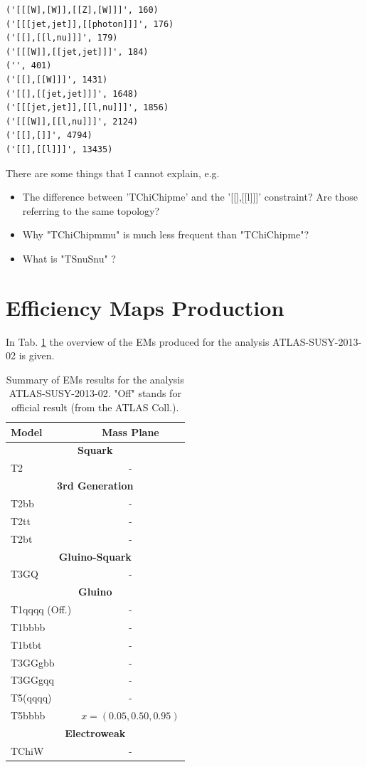 \documentclass[a4paper,11pt]{article}
\begin{document}
\begin{verbatim}
('[[[W],[W]],[[Z],[W]]]', 160)
('[[[jet,jet]],[[photon]]]', 176)
('[[],[[l,nu]]]', 179)
('[[[W]],[[jet,jet]]]', 184)
('', 401)
('[[],[[W]]]', 1431)
('[[],[[jet,jet]]]', 1648)
('[[[jet,jet]],[[l,nu]]]', 1856)
('[[[W]],[[l,nu]]]', 2124)
('[[],[]]', 4794)
('[[],[[l]]]', 13435)
\end{verbatim}

There are some things that I cannot explain, e.g.
\begin{itemize}
	\item The difference between 'TChiChipme' and the '[[],[[l]]]' constraint? Are those referring to the same topology? \\
	\item Why "TChiChipmmu" is much less frequent than "TChiChipme"? 
	\item What is "TSnuSnu" ?
\end{itemize}


  



\clearpage
\section{Efficiency Maps Production}
In Tab. \ref{EM} the overview of the EMs produced for the analysis ATLAS-SUSY-2013-02 is given. 
\begin{table}[!h]
\centering
\renewcommand{\arraystretch}{1.2}
\small
\begin{tabular}{ l  c } \toprule \toprule 
	
\textbf{Model} & \textbf{Mass Plane} \\ \toprule \toprule 
\multicolumn{2}{c}{\textbf{Squark}}  \\ \hline
T2 & - \\
\multicolumn{2}{c}{\textbf{3rd Generation}}  \\ \hline
T2bb & - \\
T2tt & - \\
T2bt & - \\

\multicolumn{2}{c}{\textbf{Gluino-Squark}}  \\ \hline
T3GQ & - \\

\multicolumn{2}{c}{\textbf{Gluino} }  \\ \hline
T1qqqq (Off.) & - \\
T1bbbb & - \\
T1btbt & - \\

T3GGgbb & - \\
T3GGgqq & - \\
T5(qqqq) & - \\
T5bbbb & $x=(0.05, 0.50, 0.95)$ \\

\multicolumn{2}{c}{\textbf{Electroweak} } \\ \hline
TChiW & - 

    \bottomrule 
  \end{tabular}
  \caption{Summary of EMs results for the analysis ATLAS-SUSY-2013-02. "Off" stands for official result (from the ATLAS Coll.).}
  \label{EM}
\end{table}
\end{document}
